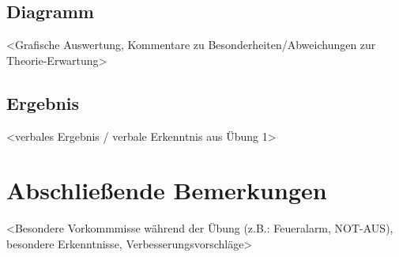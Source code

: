 	\subsection{Diagramm}
		<Grafische Auswertung, Kommentare zu Besonderheiten/Abweichungen zur Theorie-Erwartung>
		
	\subsection{Ergebnis}
		<verbales Ergebnis / verbale Erkenntnis aus Übung 1>
		
	
\section{Abschließende Bemerkungen}
	<Besondere Vorkommmisse während der Übung (z.B.: Feueralarm, NOT-AUS), besondere Erkenntnisse, Verbesserungsvorschläge>
	





